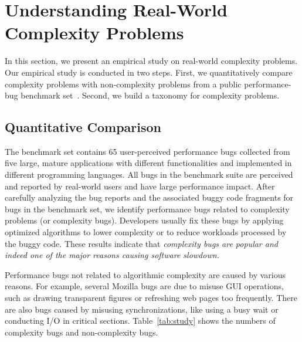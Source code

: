 \section{Understanding Real-World Complexity Problems}
\label{sec:study}


In this section, we present an empirical study on real-world 
complexity problems. Our empirical study is conducted in two steps.
First, we quantitatively compare complexity problems with non-complexity problems
from a public performance-bug benchmark set~\cite{PerfBug,SongOOPSLA2014,ldoctor}. 
Second, we build a taxonomy for complexity problems. 



\subsection{Quantitative Comparison}
\label{sec:compare}

The benchmark set contains 65 user-perceived performance bugs 
collected from five large, mature applications with different functionalities 
and implemented in different programming languages. 
All bugs in the benchmark suite are perceived and reported by real-world users
and have large performance impact. 
After carefully analyzing the bug reports and the associated buggy code fragments
for bugs in the benchmark set,
we identify \ComBugs performance bugs 
related to complexity problems (or complexity bugs). 
Developers usually fix these bugs by applying optimized algorithms to lower complexity
or to reduce workloads processed by the buggy code. 
These results indicate that \emph{complexity bugs are popular and 
indeed one of the major reasons causing software slowdown.}


Performance bugs not related to algorithmic complexity are caused by various reasons.
For example, several Mozilla bugs are due to misuse GUI operations, 
such as drawing transparent figures or refreshing web pages too frequently. 
There are also bugs caused by misusing synchronizations, 
like using a busy wait or conducting I/O in critical sections. 
Table~\ref{tab:study} shows the numbers of complexity bugs and non-complexity bugs.




